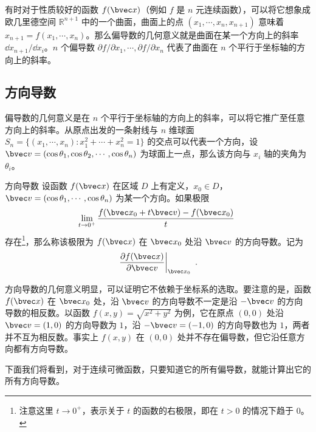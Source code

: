 有时对于性质较好的函数 $f(\bvec x)$（例如 $f$ 是 $n$ 元连续函数），可以将它想象成欧几里德空间 $\mathbb{R}^{n+1}$ 中的一个曲面，曲面上的点 $(x_1,\cdots,x_n,x_{n+1})$ 意味着 $x_{n+1}=f(x_1,\cdots,x_n)$。那么偏导数的几何意义就是曲面在某一个方向上的斜率 $\dd x_{n+1}/\dd x_i$。$n$ 个偏导数 $\partial f/\partial x_1,\cdots,\partial f/\partial x_n$ 代表了曲面在 $n$ 个平行于坐标轴的方向上的斜率。

\subsection{方向导数}
偏导数的几何意义是在 $n$ 个平行于坐标轴的方向上的斜率，可以将它推广至任意方向上的斜率。从原点出发的一条射线与 $n$ 维球面 $S_n=\{(x_1,\cdots,x_n):x_1^2+\cdots+x_n^2=1\}$ 的交点可以代表一个方向，设 $\bvec v=(\cos \theta_1,\cos\theta_2,\cdots,\cos\theta_n)$ 为球面上一点，那么该方向与 $x_i$ 轴的夹角为 $\theta_i$。
\begin{definition}{方向导数}
设函数 $f(\bvec x)$ 在区域 $D$ 上有定义，$x_0\in D$，$\bvec v=(\cos \theta_1,\cdots,\cos\theta_n)$ 为某一个方向。如果极限
\begin{equation}
\lim\limits_{t\rightarrow 0^+}\frac{f(\bvec x_0+t\bvec v)-f(\bvec x_0)}{t}~
\end{equation}
存在\footnote{注意这里 $t\rightarrow 0^+$，表示关于 $t$ 的函数的右极限，即在 $t>0$ 的情况下趋于 $0$。}，那么称该极限为 $f(\bvec x)$ 在 $\bvec x_0$ 处沿 $\bvec v$ 的方向导数。记为
\begin{equation}
\left.\frac{\partial f(\bvec x)}{\partial \bvec v}\right|_{\bvec x_0}~.
\end{equation}
\end{definition}

方向导数的几何意义明显，可以证明它不依赖于坐标系的选取。要注意的是，函数 $f(\bvec x)$ 在 $\bvec x_0$ 处，沿 $\bvec v$ 的方向导数不一定是沿 $-\bvec v$ 的方向导数的相反数。以函数 $f(x,y)=\sqrt{x^2+y^2}$ 为例，它在原点 $(0,0)$ 处沿 $\bvec v=(1,0)$ 的方向导数为 $1$，沿 $-\bvec v=(-1,0)$ 的方向导数也为 $1$，两者并不互为相反数。事实上 $f(x,y)$ 在 $(0,0)$ 处并不存在偏导数，但它沿任意方向都有方向导数。

下面我们将看到，对于连续可微函数，只要知道它的所有偏导数，就能计算出它的所有方向导数。

